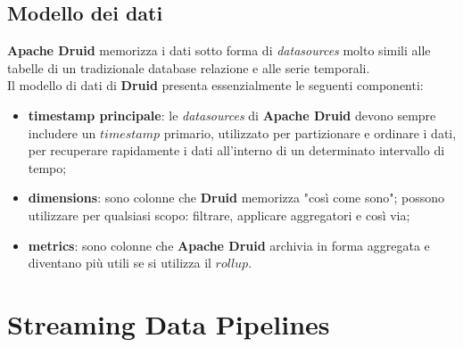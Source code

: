 \subsection{Modello dei dati}
\textbf{Apache Druid} memorizza i dati sotto forma di \textit{datasources} molto simili alle tabelle di un tradizionale database relazione e alle serie temporali.
\\Il modello di dati di \textbf{Druid} presenta essenzialmente le seguenti componenti:
\begin{itemize}
    \item \textbf{timestamp principale}:  le \textit{datasources} di \textbf{Apache Druid}  devono sempre includere un $timestamp$ primario,  utilizzato per partizionare e ordinare i dati, per recuperare rapidamente i dati all'interno di un determinato intervallo di tempo;
    \item \textbf{dimensions}: sono colonne che \textbf{Druid} memorizza "così come sono"; possono utilizzare per qualsiasi scopo: filtrare, applicare aggregatori e così via;
    \item \textbf{metrics}: sono colonne che \textbf{Apache Druid} archivia in forma aggregata e diventano più utili se si utilizza il $rollup$.
\end{itemize}
\pagebreak
\section{Streaming Data Pipelines}
